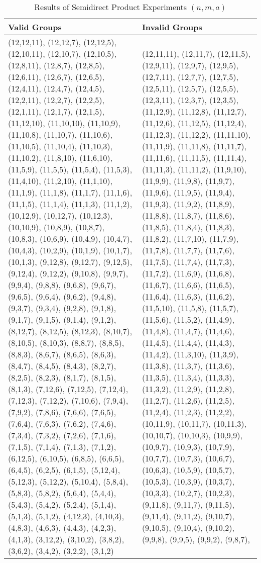 \documentclass[11pt,a4paper]{article}
\theoremstyle{definition}
\begin{document}
\begin{center}
\begin{table}[p]
\caption{Results of Semidirect Product Experiments $(n, m, a)$}
\begin{tabular}{p{7.5cm} | p{7.5cm}}
Valid Groups & Invalid Groups \\ \hline
(12,12,11), (12,12,7), (12,12,5), (12,10,11), (12,10,7), (12,10,5), (12,8,11), (12,8,7), (12,8,5), (12,6,11), (12,6,7), (12,6,5), (12,4,11), (12,4,7), (12,4,5), (12,2,11), (12,2,7), (12,2,5), (12,1,11), (12,1,7), (12,1,5), (11,12,10), (11,10,10), (11,10,9), (11,10,8), (11,10,7), (11,10,6), (11,10,5), (11,10,4), (11,10,3), (11,10,2), (11,8,10), (11,6,10), (11,5,9), (11,5,5), (11,5,4), (11,5,3), (11,4,10), (11,2,10), (11,1,10), (11,1,9), (11,1,8), (11,1,7), (11,1,6), (11,1,5), (11,1,4), (11,1,3), (11,1,2), (10,12,9), (10,12,7), (10,12,3), (10,10,9), (10,8,9), (10,8,7), (10,8,3), (10,6,9), (10,4,9), (10,4,7), (10,4,3), (10,2,9), (10,1,9), (10,1,7), (10,1,3), (9,12,8), (9,12,7), (9,12,5), (9,12,4), (9,12,2), (9,10,8), (9,9,7), (9,9,4), (9,8,8), (9,6,8), (9,6,7), (9,6,5), (9,6,4), (9,6,2), (9,4,8), (9,3,7), (9,3,4), (9,2,8), (9,1,8), (9,1,7), (9,1,5), (9,1,4), (9,1,2), (8,12,7), (8,12,5), (8,12,3), (8,10,7), (8,10,5), (8,10,3), (8,8,7), (8,8,5), (8,8,3), (8,6,7), (8,6,5), (8,6,3), (8,4,7), (8,4,5), (8,4,3), (8,2,7), (8,2,5), (8,2,3), (8,1,7), (8,1,5), (8,1,3), (7,12,6), (7,12,5), (7,12,4), (7,12,3), (7,12,2), (7,10,6), (7,9,4), (7,9,2), (7,8,6), (7,6,6), (7,6,5), (7,6,4), (7,6,3), (7,6,2), (7,4,6), (7,3,4), (7,3,2), (7,2,6), (7,1,6), (7,1,5), (7,1,4), (7,1,3), (7,1,2), (6,12,5), (6,10,5), (6,8,5), (6,6,5), (6,4,5), (6,2,5), (6,1,5), (5,12,4), (5,12,3), (5,12,2), (5,10,4), (5,8,4), (5,8,3), (5,8,2), (5,6,4), (5,4,4), (5,4,3), (5,4,2), (5,2,4), (5,1,4), (5,1,3), (5,1,2), (4,12,3), (4,10,3), (4,8,3), (4,6,3), (4,4,3), (4,2,3), (4,1,3), (3,12,2), (3,10,2), (3,8,2), (3,6,2), (3,4,2), (3,2,2), (3,1,2) & (12,11,11), (12,11,7), (12,11,5), (12,9,11), (12,9,7), (12,9,5), (12,7,11), (12,7,7), (12,7,5), (12,5,11), (12,5,7), (12,5,5), (12,3,11), (12,3,7), (12,3,5), (11,12,9), (11,12,8), (11,12,7), (11,12,6), (11,12,5), (11,12,4), (11,12,3), (11,12,2), (11,11,10), (11,11,9), (11,11,8), (11,11,7), (11,11,6), (11,11,5), (11,11,4), (11,11,3), (11,11,2), (11,9,10), (11,9,9), (11,9,8), (11,9,7), (11,9,6), (11,9,5), (11,9,4), (11,9,3), (11,9,2), (11,8,9), (11,8,8), (11,8,7), (11,8,6), (11,8,5), (11,8,4), (11,8,3), (11,8,2), (11,7,10), (11,7,9), (11,7,8), (11,7,7), (11,7,6), (11,7,5), (11,7,4), (11,7,3), (11,7,2), (11,6,9), (11,6,8), (11,6,7), (11,6,6), (11,6,5), (11,6,4), (11,6,3), (11,6,2), (11,5,10), (11,5,8), (11,5,7), (11,5,6), (11,5,2), (11,4,9), (11,4,8), (11,4,7), (11,4,6), (11,4,5), (11,4,4), (11,4,3), (11,4,2), (11,3,10), (11,3,9), (11,3,8), (11,3,7), (11,3,6), (11,3,5), (11,3,4), (11,3,3), (11,3,2), (11,2,9), (11,2,8), (11,2,7), (11,2,6), (11,2,5), (11,2,4), (11,2,3), (11,2,2), (10,11,9), (10,11,7), (10,11,3), (10,10,7), (10,10,3), (10,9,9), (10,9,7), (10,9,3), (10,7,9), (10,7,7), (10,7,3), (10,6,7), (10,6,3), (10,5,9), (10,5,7), (10,5,3), (10,3,9), (10,3,7), (10,3,3), (10,2,7), (10,2,3), (9,11,8), (9,11,7), (9,11,5), (9,11,4), (9,11,2), (9,10,7), (9,10,5), (9,10,4), (9,10,2), (9,9,8), (9,9,5), (9,9,2), (9,8,7), 
\end{tabular}
\end{table}
\end{center}
\end{document}
